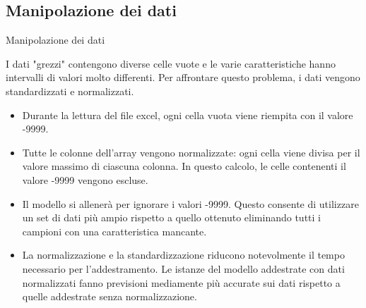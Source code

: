 \documentclass{beamer}
\begin{document}
\subsection{Manipolazione dei dati}
\begin{frame}{Manipolazione dei dati}

I dati "grezzi" contengono diverse celle vuote e le varie caratteristiche hanno intervalli di valori molto differenti. Per affrontare questo problema, i dati vengono standardizzati e normalizzati.
\pause
\begin{itemize}
\item Durante la lettura del file excel, ogni cella vuota viene riempita con il valore -9999.
\pause
\item Tutte le colonne dell'array vengono normalizzate: ogni cella viene divisa per il valore massimo di ciascuna colonna. In questo calcolo, le celle contenenti il valore -9999 vengono escluse.
\pause
\item Il modello si allenerà per ignorare i valori -9999. Questo consente di utilizzare un set di dati più ampio rispetto a quello ottenuto eliminando tutti i campioni con una caratteristica mancante.
\pause
\item La normalizzazione e la standardizzazione riducono notevolmente il tempo necessario per l'addestramento. Le istanze del modello addestrate con dati normalizzati fanno previsioni mediamente più accurate sui dati rispetto a quelle addestrate senza normalizzazione.
\end{itemize}

\end{frame}


\end{document}
